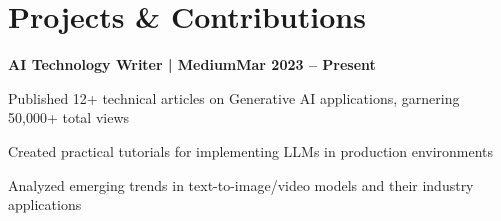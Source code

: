 \documentclass[letterpaper,10pt]{article}
\newcommand{\heading}[2]{
  \hspace{10pt}#1\hfill#2\\
}
\newcommand{\headingBf}[2]{
  \heading{\textbf{#1}}{\textbf{#2}}
}
\newenvironment{resume_list}{
  \vspace{-7pt}
  \begin{itemize}[itemsep=-2px, parsep=1pt, leftmargin=30pt]
}{
  \end{itemize}
}
\begin{document}

  \section{Projects \& Contributions}

  \headingBf{AI Technology Writer | Medium}{Mar 2023 -- Present}
  \begin{resume_list}
    \item Published 12+ technical articles on Generative AI applications, garnering 50,000+ total views
    \item Created practical tutorials for implementing LLMs in production environments
    \item Analyzed emerging trends in text-to-image/video models and their industry applications
  \end{resume_list}
\end{document}
